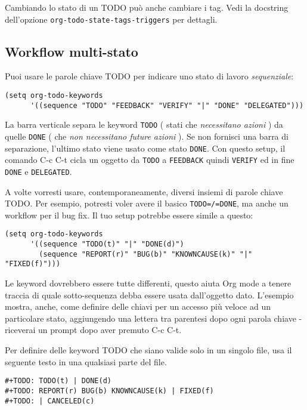 \documentclass[11pt]{article}
\begin{document}
Cambiando lo stato di un TODO può anche cambiare i tag. Vedi la
docstring dell'opzione \texttt{org-todo-state-tags-triggers} per dettagli.

\subsection{Workflow multi-stato}
\label{sec:org2c9a7e0}
Puoi usare le parole chiave TODO per indicare uno stato di lavoro
\emph{sequenziale}:

\begin{verbatim}
(setq org-todo-keywords
      '((sequence "TODO" "FEEDBACK" "VERIFY" "|" "DONE" "DELEGATED")))
\end{verbatim}

La barra verticale separa le keyword \texttt{TODO} ( stati che \emph{necessitano
azioni} ) da quelle \texttt{DONE} ( che \emph{non necessitano future azioni} ). Se
non fornisci una barra di separazione, l'ultimo stato viene usato come
stato \texttt{DONE}. Con questo setup, il comando C-c C-t cicla un
oggetto da \texttt{TODO} a \texttt{FEEDBACK} quindi \texttt{VERIFY} ed in fine \texttt{DONE} e
\texttt{DELEGATED}.

A volte vorresti usare, contemporaneamente, diversi insiemi di parole chiave
TODO. Per esempio, potresti voler avere il basico \texttt{TODO=/=DONE}, ma
anche un workflow per il bug fix. Il tuo setup potrebbe essere simile
a questo:

\begin{verbatim}
(setq org-todo-keywords
      '((sequence "TODO(t)" "|" "DONE(d)")
        (sequence "REPORT(r)" "BUG(b)" "KNOWNCAUSE(k)" "|" "FIXED(f)")))
\end{verbatim}

Le keyword dovrebbero essere tutte differenti, questo aiuta Org mode a
tenere traccia di quale sotto-sequenza debba essere usata dall'oggetto
dato. L'esempio mostra, anche, come definire delle chiavi per un
accesso più veloce ad un particolare stato, aggiungendo una lettera
tra parentesi dopo ogni parola chiave - riceverai un prompt dopo aver
premuto C-c C-t.

Per definire delle keyword TODO che siano valide solo in un singolo
file, usa il seguente testo in una qualsiasi parte del file.

\begin{verbatim}
#+TODO: TODO(t) | DONE(d)
#+TODO: REPORT(r) BUG(b) KNOWNCAUSE(k) | FIXED(f)
#+TODO: | CANCELED(c)
\end{verbatim}
\end{document}
